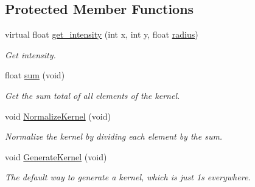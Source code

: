 \subsection*{Protected Member Functions}
\begin{DoxyCompactItemize}
\item 
virtual float \hyperlink{classimage__tools_1_1Kernel_a214a76e32ad4bedf68045f8df423689a}{get\+\_\+intensity} (int x, int y, float \hyperlink{classimage__tools_1_1Kernel_ac834d16a242dd4a15f5f5e4a6dacea01}{radius})\hypertarget{classimage__tools_1_1Kernel_a214a76e32ad4bedf68045f8df423689a}{}\label{classimage__tools_1_1Kernel_a214a76e32ad4bedf68045f8df423689a}

\begin{DoxyCompactList}\small\item\em Get intensity. \end{DoxyCompactList}\item 
float \hyperlink{classimage__tools_1_1Kernel_af2c442a9969338d4ede4572526353833}{sum} (void)\hypertarget{classimage__tools_1_1Kernel_af2c442a9969338d4ede4572526353833}{}\label{classimage__tools_1_1Kernel_af2c442a9969338d4ede4572526353833}

\begin{DoxyCompactList}\small\item\em Get the sum total of all elements of the kernel. \end{DoxyCompactList}\item 
void \hyperlink{classimage__tools_1_1Kernel_aac797e48d4e2880752fe805455e68216}{Normalize\+Kernel} (void)\hypertarget{classimage__tools_1_1Kernel_aac797e48d4e2880752fe805455e68216}{}\label{classimage__tools_1_1Kernel_aac797e48d4e2880752fe805455e68216}

\begin{DoxyCompactList}\small\item\em Normalize the kernel by dividing each element by the sum. \end{DoxyCompactList}\item 
void \hyperlink{classimage__tools_1_1Kernel_ad8e455573607e492d945eb37432926fd}{Generate\+Kernel} (void)\hypertarget{classimage__tools_1_1Kernel_ad8e455573607e492d945eb37432926fd}{}\label{classimage__tools_1_1Kernel_ad8e455573607e492d945eb37432926fd}

\begin{DoxyCompactList}\small\item\em The default way to generate a kernel, which is just 1\textquotesingle{}s everywhere. \end{DoxyCompactList}\end{DoxyCompactItemize}
